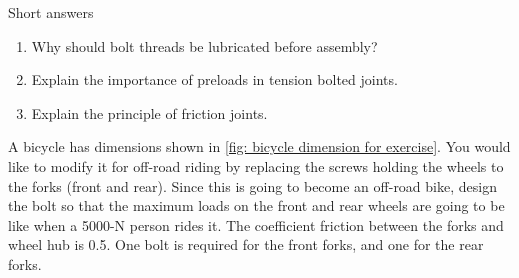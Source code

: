 \documentclass[
10pt,
a4paper,
openany,
svgnames,
]{book}
\newcommand{\exercise}{%
\item \label{lab:\arabic{chapter}-\arabic{exercisesi}}  %
}
\begin{document}
\begin{exercises}
  \exercise Short answers
  \begin{enumerate}
  \item Why should bolt threads be lubricated before assembly?
  \item Explain the importance of preloads in tension bolted joints.
  \item Explain the principle of friction joints.
  \end{enumerate}
  
  \exercise \label{exercise: bolt for bicycle fork} A bicycle has dimensions shown in \cref{fig: bicycle dimension for exercise}. You would like to modify it for off-road riding by replacing the screws holding the wheels to the forks (front and rear). Since this is going to become an off-road bike, design the bolt so that the maximum loads on the front and rear wheels are going to be like when a 5000-N person rides it. The coefficient friction between the forks and wheel hub is 0.5. One bolt is required for the front forks, and one for the rear forks.
  

\end{exercises}
\end{document}
